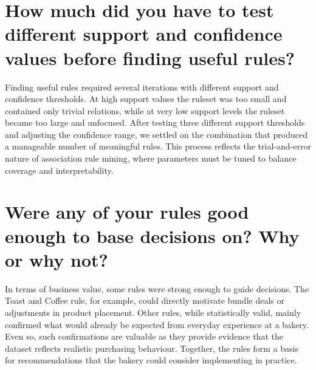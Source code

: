 \section*{How much did you have to test different support and confidence values before finding useful rules?}
Finding useful rules required several iterations with different support and confidence thresholds. At high 
support values the ruleset was too small and contained only trivial relations, while at very low support 
levels the ruleset became too large and unfocused. After testing three different support thresholds and 
adjusting the confidence range, we settled on the combination that produced a manageable number of meaningful 
rules. This process reflects the trial-and-error nature of association rule mining, where parameters must be 
tuned to balance coverage and interpretability.


\section*{Were any of your rules good enough to base decisions on? Why or why not?}
In terms of business value, some rules were strong enough to guide decisions. The Toast and Coffee rule, for 
example, could directly motivate bundle deals or adjustments in product placement. Other rules, while statistically 
valid, mainly confirmed what would already be expected from everyday experience at a bakery. Even so, such 
confirmations are valuable as they provide evidence that the dataset reflects realistic purchasing behaviour. 
Together, the rules form a basis for recommendations that the bakery could consider implementing in practice.